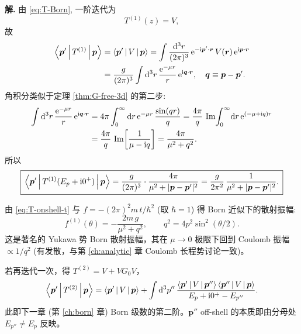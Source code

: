 \textbf{解.}
由 \eqref{eq:T-Born}, 一阶迭代为
\begin{equation}
  T^{(1)}(z) = V,
\end{equation}
故
\begin{align}
  \left\langle \bm p' \,\middle|\, T^{(1)} \,\middle|\, \bm p \right\rangle
  &= \left\langle \bm p' \,\middle|\, V \,\middle|\, \bm p \right\rangle
   = \int\frac{\mathrm{d}^3 r}{(2\pi)^3}\,
     \mathrm{e}^{-\mathrm{i}\bm p'\cdot\bm r}\,V(\bm r)\,\mathrm{e}^{\mathrm{i}\bm p\cdot\bm r}\notag\\
  &= \frac{g}{(2\pi)^3}\int\mathrm{d}^3 r\,
     \frac{\mathrm{e}^{-\mu r}}{r}\,\mathrm{e}^{\mathrm{i}\bm q\cdot\bm r},
\quad \bm q\equiv\bm p-\bm p'.\label{eq:G-Yukawa-step1}
\end{align}
角积分类似于定理 \ref{thm:G-free-3d} 的第二步:
\begin{align}
  \int\mathrm{d}^3 r\,\frac{\mathrm{e}^{-\mu r}}{r}\,\mathrm{e}^{\mathrm{i}\bm q\cdot\bm r}
  &= 4\pi\int_0^\infty\mathrm{d} r\,\mathrm{e}^{-\mu r}\,\frac{\sin(qr)}{q}
   = \frac{4\pi}{q}\,\Im\!\int_0^\infty\!\mathrm{d} r\,\mathrm{e}^{(-\mu+\mathrm{i} q)r}\notag\\
  &= \frac{4\pi}{q}\,\Im\!\left[\frac{1}{\mu-\mathrm{i} q}\right]
   = \frac{4\pi}{\mu^2+q^2}.
\end{align}
所以
\begin{equation}\label{eq:G-Yukawa-T1}
  \boxed{\,
    \left\langle \bm p' \,\middle|\, T^{(1)}(E_p+\mathrm{i} 0^+) \,\middle|\, \bm p \right\rangle
    = \frac{g}{(2\pi)^3}\cdot\frac{4\pi}{\mu^2+|\bm p-\bm p'|^2}
    = \frac{g}{2\pi^2}\,\frac{1}{\mu^2+|\bm p-\bm p'|^2}.
  \,}
\end{equation}

由 \eqref{eq:T-onshell-t} 与 $f=-(2\pi)^2 m\,t/\hbar^2$ (取 $\hbar=1$) 得 Born 近似下的散射振幅:
\begin{equation}\label{eq:G-Yukawa-fBorn}
  f^{(1)}(\theta)
  = -\frac{2m\,g}{\mu^2+q^2},\qquad q^2=4p^2\sin^2(\theta/2).
\end{equation}
这是著名的 Yukawa 势 Born 散射振幅，其在 $\mu\to 0$ 极限下回到 Coulomb 振幅
$\propto 1/q^2$ (有发散，与第 \ref{ch:analytic} 章 Coulomb 长程势讨论一致)。

\begin{remark}
若再迭代一次，得 $T^{(2)}=V+VG_0 V$，
\begin{equation}
  \left\langle \bm p' \,\middle|\, T^{(2)} \,\middle|\, \bm p \right\rangle
  = \left\langle \bm p' \,\middle|\, V \,\middle|\, \bm p \right\rangle
  + \int\mathrm{d}^3 p''\,
    \frac{\left\langle \bm p' \,\middle|\, V \,\middle|\, \bm p'' \right\rangle\left\langle \bm p'' \,\middle|\, V \,\middle|\, \bm p \right\rangle}{E_p+\mathrm{i} 0^+ - E_{p''}}.
\end{equation}
此即下一章 (第 \ref{ch:born} 章) Born 级数的第二阶。$\bm p''$ off-shell 的本质即由分母处 $E_{p''}\neq E_p$ 反映。
\end{remark}

